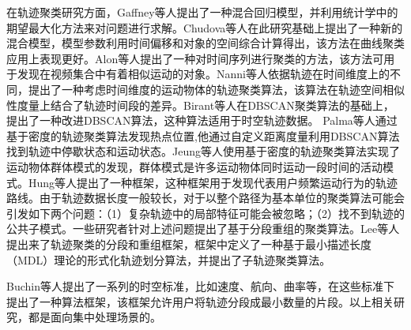 在轨迹聚类研究方面，Gaffney等人提出了一种混合回归模型，并利用统计学中的期望最大化方法来对问题进行求解。Chudova等人在此研究基础上提出了一种新的混合模型，模型参数利用时间偏移和对象的空间综合计算得出，该方法在曲线聚类应用上表现更好。Alon等人提出了一种对时间序列进行聚类的方法，该方法可用于发现在视频集合中有着相似运动的对象。Nanni等人依据轨迹在时间维度上的不同，提出了一种考虑时间维度的运动物体的轨迹聚类算法，该算法在轨迹空间相似性度量上结合了轨迹时间段的差异。Birant等人在DBSCAN聚类算法的基础上，提出了一种改进DBSCAN算法，这种算法适用于时空轨迹数据。
Palma等人通过基于密度的轨迹聚类算法发现热点位置,他通过自定义距离度量利用DBSCAN算法找到轨迹中停歇状态和运动状态。Jeung等人使用基于密度的轨迹聚类算法实现了运动物体群体模式的发现，群体模式是许多运动物体同时运动一段时间的活动模式。Hung等人提出了一种框架，这种框架用于发现代表用户频繁运动行为的轨迹路线。由于轨迹数据长度一般较长，对于以整个路径为基本单位的聚类算法可能会引发如下两个问题：（1）复杂轨迹中的局部特征可能会被忽略；（2）找不到轨迹的公共子模式。一些研究者针对上述问题提出了基于分段重组的聚类算法。Lee等人提出来了轨迹聚类的分段和重组框架，框架中定义了一种基于最小描述长度（MDL）理论的形式化轨迹划分算法，并提出了子轨迹聚类算法。

Buchin等人提出了一系列的时空标准，比如速度、航向、曲率等，在这些标准下提出了一种算法框架，该框架允许用户将轨迹分段成最小数量的片段。以上相关研究，都是面向集中处理场景的。

